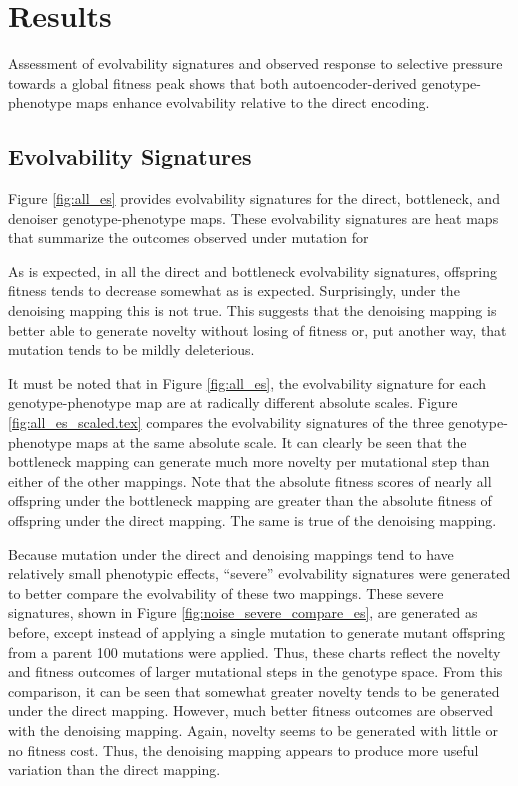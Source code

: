 \section{Results} \label{sec:results}

Assessment of evolvability signatures and observed response to selective pressure towards a global fitness peak shows that both autoencoder-derived genotype-phenotype maps enhance evolvability relative to the direct encoding.

\subsection{Evolvability Signatures}






Figure \ref{fig:all_es} provides evolvability signatures for the direct, bottleneck, and denoiser genotype-phenotype maps.
These evolvability signatures are heat maps that summarize the outcomes observed under mutation for

As is expected, in all the direct and bottleneck evolvability signatures, offspring fitness tends to decrease somewhat as is expected.
Surprisingly, under the denoising mapping this is not true.
This suggests that the denoising mapping is better able to generate novelty without losing of fitness or, put another way, that mutation tends to be mildly deleterious.

It must be noted that in Figure \ref{fig:all_es}, the evolvability signature for each genotype-phenotype map are at radically different absolute scales.
Figure \ref{fig:all_es_scaled.tex} compares the evolvability signatures of the three genotype-phenotype maps at the same absolute scale.
It can clearly be seen that the bottleneck mapping can generate much more novelty per mutational step than either of the other mappings.
Note that the absolute fitness scores of nearly all offspring under the bottleneck mapping are greater than the absolute fitness of offspring under the direct mapping.
The same is true of the denoising mapping.

Because mutation under the direct and denoising mappings tend to have relatively small phenotypic effects, ``severe'' evolvability signatures were generated to better compare the evolvability of these two mappings.
These severe signatures, shown in Figure \ref{fig:noise_severe_compare_es}, are generated as before, except instead of applying a single mutation to generate mutant offspring from a parent 100 mutations were applied.
Thus, these charts reflect the novelty and fitness outcomes of larger mutational steps in the genotype space.
From this comparison, it can be seen that somewhat greater novelty tends to be generated under the direct mapping.
However, much better fitness outcomes are observed with the denoising mapping.
Again, novelty seems to be generated with little or no fitness cost.
Thus, the denoising mapping appears to produce more useful variation than the direct mapping.

